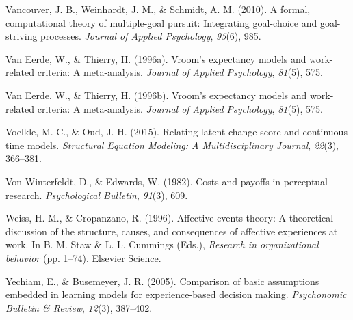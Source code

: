 \documentclass[english,,man]{apa6}
\theoremstyle{definition}
\theoremstyle{definition}
\theoremstyle{definition}
\theoremstyle{remark}
\begin{document}
\leavevmode\hypertarget{ref-vancouver2010}{}%
Vancouver, J. B., Weinhardt, J. M., \& Schmidt, A. M. (2010). A formal,
computational theory of multiple-goal pursuit: Integrating goal-choice
and goal-striving processes. \emph{Journal of Applied Psychology},
\emph{95}(6), 985.

\leavevmode\hypertarget{ref-van1996}{}%
Van Eerde, W., \& Thierry, H. (1996a). Vroom's expectancy models and
work-related criteria: A meta-analysis. \emph{Journal of Applied
Psychology}, \emph{81}(5), 575.

\leavevmode\hypertarget{ref-vaneerde1996}{}%
Van Eerde, W., \& Thierry, H. (1996b). Vroom's expectancy models and
work-related criteria: A meta-analysis. \emph{Journal of Applied
Psychology}, \emph{81}(5), 575.

\leavevmode\hypertarget{ref-voelkle2015relating}{}%
Voelkle, M. C., \& Oud, J. H. (2015). Relating latent change score and
continuous time models. \emph{Structural Equation Modeling: A
Multidisciplinary Journal}, \emph{22}(3), 366--381.

\leavevmode\hypertarget{ref-von1982}{}%
Von Winterfeldt, D., \& Edwards, W. (1982). Costs and payoffs in
perceptual research. \emph{Psychological Bulletin}, \emph{91}(3), 609.

\leavevmode\hypertarget{ref-weissaffective}{}%
Weiss, H. M., \& Cropanzano, R. (1996). Affective events theory: A
theoretical discussion of the structure, causes, and consequences of
affective experiences at work. In B. M. Staw \& L. L. Cummings (Eds.),
\emph{Research in organizational behavior} (pp. 1--74). Elsevier
Science.

\leavevmode\hypertarget{ref-yechiam2005}{}%
Yechiam, E., \& Busemeyer, J. R. (2005). Comparison of basic assumptions
embedded in learning models for experience-based decision making.
\emph{Psychonomic Bulletin \& Review}, \emph{12}(3), 387--402.
\end{document}

